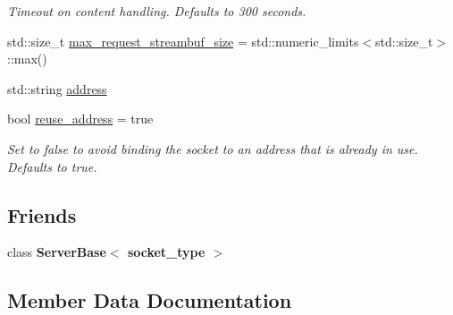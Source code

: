 \begin{DoxyCompactItemize}
\begin{DoxyCompactList}\small\item\em Timeout on content handling. Defaults to 300 seconds. \end{DoxyCompactList}\item 
std\+::size\+\_\+t \hyperlink{classSimpleWeb_1_1ServerBase_1_1Config_a81bd9a4816000009f3f6abee3400fb7a}{max\+\_\+request\+\_\+streambuf\+\_\+size} = std\+::numeric\+\_\+limits$<$std\+::size\+\_\+t$>$\+::max()
\item 
std\+::string \hyperlink{classSimpleWeb_1_1ServerBase_1_1Config_add7a705aca3533bf0371708b19bb691c}{address}
\item 
bool \hyperlink{classSimpleWeb_1_1ServerBase_1_1Config_aab9c347da5390b176d37dac2dfbd9fae}{reuse\+\_\+address} = true\hypertarget{classSimpleWeb_1_1ServerBase_1_1Config_aab9c347da5390b176d37dac2dfbd9fae}{}\label{classSimpleWeb_1_1ServerBase_1_1Config_aab9c347da5390b176d37dac2dfbd9fae}

\begin{DoxyCompactList}\small\item\em Set to false to avoid binding the socket to an address that is already in use. Defaults to true. \end{DoxyCompactList}\end{DoxyCompactItemize}
\subsection*{Friends}
\begin{DoxyCompactItemize}
\item 
class {\bfseries Server\+Base$<$ socket\+\_\+type $>$}\hypertarget{classSimpleWeb_1_1ServerBase_1_1Config_a01d54a7e16ca437c98ec571deca98dfc}{}\label{classSimpleWeb_1_1ServerBase_1_1Config_a01d54a7e16ca437c98ec571deca98dfc}

\end{DoxyCompactItemize}


\subsection{Member Data Documentation}
